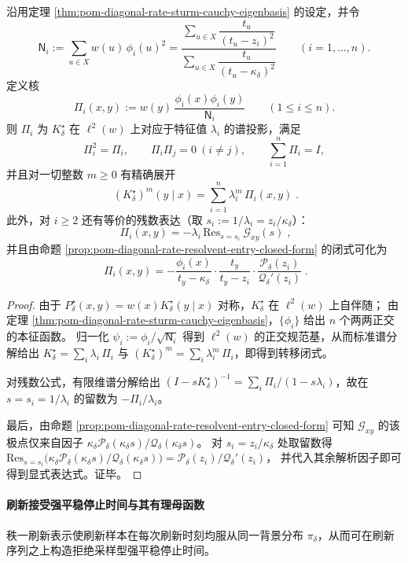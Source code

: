 \begin{theorem}\label{thm:pom-diagonal-rate-spectral-projector-residue-and-transition}
沿用定理 \ref{thm:pom-diagonal-rate-sturm-cauchy-eigenbasis} 的设定，并令
\[
\mathsf N_i:=\sum_{u\in X}w(u)\,\phi_i(u)^2
=\frac{\sum_{u\in X}\dfrac{t_u}{(t_u-z_i)^2}}{\sum_{u\in X}\dfrac{t_u}{(t_u-\kappa_\delta)^2}}
\qquad(i=1,\dots,n).
\]
定义核
\[
\Pi_i(x,y):=w(y)\,\frac{\phi_i(x)\phi_i(y)}{\mathsf N_i}\qquad(1\le i\le n).
\]
则 \(\Pi_i\) 为 \(K^\star_\delta\) 在 \(\ell^2(w)\) 上对应于特征值 \(\lambda_i\) 的谱投影，满足
\[
\Pi_i^2=\Pi_i,\qquad \Pi_i\Pi_j=0\ (i\ne j),\qquad \sum_{i=1}^{n}\Pi_i=I,
\]
并且对一切整数 \(m\ge 0\) 有精确展开
\[
\boxed{\;
(K^\star_\delta)^m(y\mid x)=\sum_{i=1}^{n}\lambda_i^m\,\Pi_i(x,y)\; }.
\]
此外，对 \(i\ge 2\) 还有等价的残数表达（取 \(s_i:=1/\lambda_i=z_i/\kappa_\delta\)）：
\[
\boxed{\;
\Pi_i(x,y)=-\lambda_i\,\mathrm{Res}_{s=s_i}\ \mathcal G_{xy}(s)\; } ,
\]
并且由命题 \ref{prop:pom-diagonal-rate-resolvent-entry-closed-form} 的闭式可化为
\[
\boxed{\;
\Pi_i(x,y)
=-\frac{\phi_i(x)}{t_y-\kappa_\delta}\cdot\frac{t_y}{t_y-z_i}\cdot
\frac{\mathcal P_\delta(z_i)}{\mathcal Q_\delta'(z_i)}\; } .
\]
\end{theorem}
\begin{proof}
由于 \(P^\star_\delta(x,y)=w(x)K^\star_\delta(y\mid x)\) 对称，\(K^\star_\delta\) 在 \(\ell^2(w)\) 上自伴随；
由定理 \ref{thm:pom-diagonal-rate-sturm-cauchy-eigenbasis}，\(\{\phi_i\}\) 给出 \(n\) 个两两正交的本征函数。
归一化 \(\psi_i:=\phi_i/\sqrt{\mathsf N_i}\) 得到 \(\ell^2(w)\) 的正交规范基，从而标准谱分解给出
\(
K^\star_\delta=\sum_i \lambda_i\,\Pi_i
\)
与
\(
(K^\star_\delta)^m=\sum_i \lambda_i^m\,\Pi_i
\)，即得到转移闭式。
\par
对残数公式，有限维谱分解给出
\(
(I-sK^\star_\delta)^{-1}=\sum_i \Pi_i/(1-s\lambda_i)
\)，故在 \(s=s_i=1/\lambda_i\) 的留数为 \(-\Pi_i/\lambda_i\)。
\par
最后，由命题 \ref{prop:pom-diagonal-rate-resolvent-entry-closed-form} 可知 \(\mathcal G_{xy}\) 的该极点仅来自因子
\(
\kappa_\delta\mathcal P_\delta(\kappa_\delta s)/\mathcal Q_\delta(\kappa_\delta s)
\)。
对 \(s_i=z_i/\kappa_\delta\) 处取留数得
\(
\mathrm{Res}_{s=s_i}\bigl(\kappa_\delta\mathcal P_\delta(\kappa_\delta s)/\mathcal Q_\delta(\kappa_\delta s)\bigr)
=\mathcal P_\delta(z_i)/\mathcal Q_\delta'(z_i)
\)，
并代入其余解析因子即可得到显式表达式。证毕。
\end{proof}

\paragraph{刷新接受强平稳停止时间与其有理母函数}
秩一刷新表示使刷新样本在每次刷新时刻均服从同一背景分布 \(\pi_\delta\)，从而可在刷新序列之上构造拒绝采样型强平稳停止时间。


